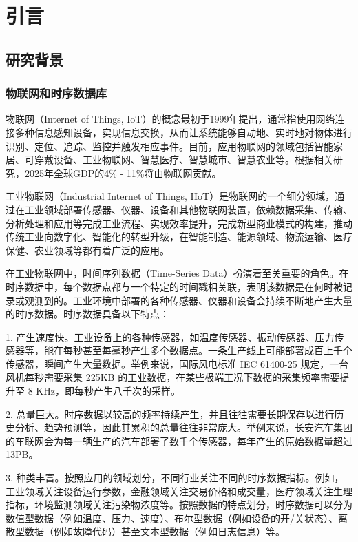 
\chapter{引言}


\section{研究背景}\label{1-background}

\subsection{物联网和时序数据库}
物联网（Internet of Things, IoT）的概念最初于1999年提出，通常指使用网络连接多种信息感知设备，实现信息交换，从而让系统能够自动地、实时地对物体进行识别、定位、追踪、监控并触发相应事件\cite{王保云2009物联网技术研究综述木}。目前，应用物联网的领域包括智能家居、可穿戴设备、工业物联网、智慧医疗、智慧城市、智慧农业等。根据相关研究，2025年全球GDP的4\% - 11\%将由物联网贡献\cite{mouha2021internet}。

工业物联网（Industrial Internet of Things, IIoT）\cite{sisinni2018industrial}是物联网的一个细分领域，通过在工业领域部署传感器、仪器、设备和其他物联网装置，依赖数据采集、传输、分析处理和应用等完成工业流程、实现效率提升，完成新型商业模式的构建，推动传统工业向数字化、智能化的转型升级，在智能制造、能源领域、物流运输、医疗保健、农业领域等都有着广泛的应用。

在工业物联网中，时间序列数据（Time-Series Data）\cite{dunning2015tsdb}扮演着至关重要的角色。在时序数据中，每个数据点都与一个特定的时间戳相关联，表明该数据是在何时被记录或观测到的。工业环境中部署的各种传感器、仪器和设备会持续不断地产生大量的时序数据。时序数据具备以下特点：

1. 产生速度快。工业设备上的各种传感器，如温度传感器、振动传感器、压力传感器等，能在每秒甚至每毫秒产生多个数据点。一条生产线上可能部署成百上千个传感器，瞬间产生大量数据。举例来说，国际风电标准 IEC 61400-25 规定，一台风机每秒需要采集 225KB 的工业数据，在某些极端工况下数据的采集频率需要提升至 8 KHz\cite{PZKX202005001}，即每秒产生八千次的采样。

2. 总量巨大。时序数据以较高的频率持续产生，并且往往需要长期保存以进行历史分析、趋势预测等，因此其累积的总量往往非常庞大。举例来说，长安汽车集团的车联网会为每一辆生产的汽车部署了数千个传感器，每年产生的原始数据量超过13PB。

3. 种类丰富。按照应用的领域划分，不同行业关注不同的时序数据指标。例如，工业领域关注设备运行参数，金融领域关注交易价格和成交量，医疗领域关注生理指标，环境监测领域关注污染物浓度等。按照数据的特点划分，时序数据可以分为数值型数据（例如温度、压力、速度）、布尔型数据（例如设备的开/关状态）、离散型数据（例如故障代码）甚至文本型数据（例如日志信息）等。

